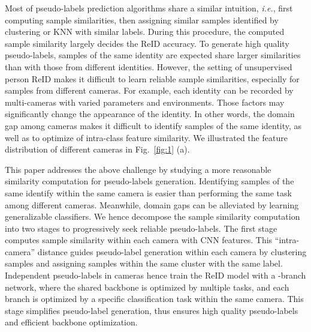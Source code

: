 \documentclass[final]{cvpr}
\begin{document}
Most of pseudo-labels prediction algorithms share a similar intuition, \emph{i.e.}, first computing sample similarities, then assigning similar samples identified by clustering or KNN with similar labels. During this procedure, the computed sample similarity largely decides the ReID accuracy. To generate high quality pseudo-labels, samples of the same identity are expected share larger similarities than with those from different identities. However, the setting of unsupervised person ReID makes it difficult to learn reliable sample similarities, especially for samples from different cameras. For example, each identity can be recorded by multi-cameras with varied parameters and environments. Those factors may significantly change the appearance of the identity. In other words, the domain gap among cameras makes it difficult to identify samples of the same identity, as well as to optimize of intra-class feature similarity. We illustrated the feature distribution of different cameras in Fig.~\ref{fig:1} (a).

This paper addresses the above challenge by studying a more reasonable similarity computation for pseudo-labels generation. Identifying samples of the same identify within the same camera is easier than performing the same task among different cameras. Meanwhile, domain gaps can be alleviated by learning generalizable classifiers. We hence decompose the sample similarity computation into two stages to progressively seek reliable pseudo-labels. The first stage computes sample similarity within each camera with CNN features. This ``intra-camera'' distance guides pseudo-label generation within each camera by clustering samples and assigning samples within the same cluster with the same label. Independent pseudo-labels in  cameras hence train the ReID model with a -branch network, where the shared backbone is optimized by multiple tasks, and each branch is optimized by a specific classification task within the same camera. This stage simplifies pseudo-label generation, thus ensures high quality pseudo-labels and efficient backbone optimization.
\end{document}
